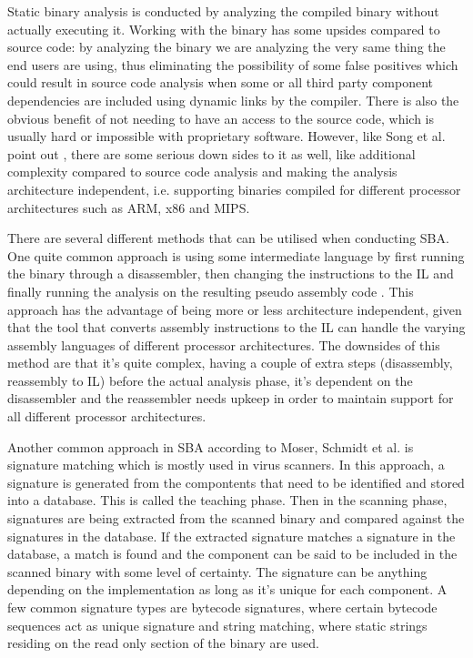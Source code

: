 Static binary analysis is conducted by analyzing the compiled binary without actually executing it.
Working with the binary has some upsides compared to source code: by analyzing the binary we are
analyzing the very same thing the end users are using, thus eliminating the possibility of some
false positives which could result in source code analysis when some or all third party component
dependencies are included using dynamic links by the compiler. There is also the obvious benefit of
not needing to have an access to the source code, which is usually hard or impossible with
proprietary software. However, like Song et al. point out \cite{song2008bitblaze}, there are some
serious down sides to it as well, like additional complexity compared to source code analysis and
making the analysis architecture independent, i.e. supporting binaries compiled for different
processor architectures such as ARM, x86 and MIPS.

There are several different methods that can be utilised when conducting SBA. One quite common
approach is using some intermediate language by first running the binary through a disassembler,
then changing the instructions to the IL and finally running the analysis on the resulting pseudo
assembly code \cite{song2008bitblaze, brumley2011bap}. This approach has the advantage of being
more or less architecture independent, given that the tool that converts assembly instructions to
the IL can handle the varying assembly languages of different processor architectures. The
downsides of this method are that it's quite complex, having a couple of extra steps (disassembly,
reassembly to IL) before the actual analysis phase, it's dependent on the disassembler and the
reassembler needs upkeep in order to maintain support for all different processor architectures.

Another common approach in SBA according to Moser, Schmidt et al. \cite{moser2007limits,
schmidt2009static} is signature matching which is mostly used in virus scanners. In this approach,
a signature is generated from the compontents that need to be identified and stored into a
database. This is called the teaching phase. Then in the scanning phase, signatures are being
extracted from the scanned binary and compared against the signatures in the database. If the
extracted signature matches a signature in the database, a match is found and the component can be
said to be included in the scanned binary with some level of certainty. The signature can be
anything depending on the implementation as long as it's unique for each component. A few common
signature types are bytecode signatures, where certain bytecode sequences act as unique signature
and string matching, where static strings residing on the read only section of the binary are used.

